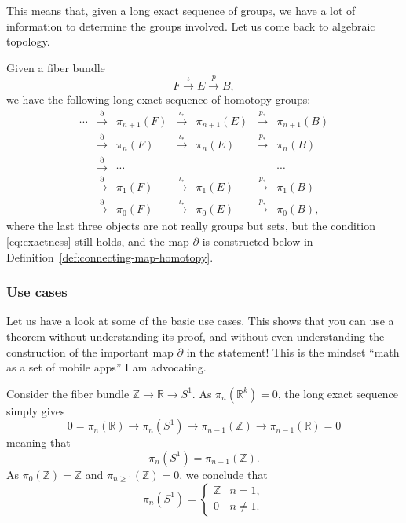 \documentclass[12pt]{article}
\numberwithin{equation}{section}
\def\bR{\mathbb{R}}
\def\bZ{\mathbb{Z}}
\begin{document}
This means that, given a long exact sequence of groups,
we have a lot of information to determine the groups involved.
Let us come back to algebraic topology.
\begin{theorem}
  \label{thm:long-exact-seq-homotopy}
  Given a fiber bundle \begin{equation}
    F\stackrel{\iota}{\longrightarrow} E\stackrel{p}{\longrightarrow} B,
  \end{equation}
  we have the following long exact sequence of homotopy groups: 
  \begin{equation}\begin{array}{cccccccc}
    \cdots 
      & \stackrel{\partial}{\longrightarrow} & \pi_{n+1}(F)  
      & \stackrel{\iota_*}{\longrightarrow} & \pi_{n+1}(E)
      & \stackrel{p_*}{\longrightarrow} & \pi_{n+1}(B)  \\
      & \stackrel{\partial}{\longrightarrow} & \pi_{n}(F)  
      & \stackrel{\iota_*}{\longrightarrow} & \pi_{n}(E)
      & \stackrel{p_*}{\longrightarrow} & \pi_{n}(B)  \\
      & \stackrel{\partial}{\longrightarrow} & \cdots & &&& \cdots \\
      & \stackrel{\partial}{\longrightarrow} & \pi_{1}(F)  
      & \stackrel{\iota_*}{\longrightarrow} & \pi_{1}(E)
      & \stackrel{p_*}{\longrightarrow} & \pi_{1}(B) \\
      & \stackrel{\partial}{\longrightarrow} & \pi_{0}(F)  
      & \stackrel{\iota_*}{\longrightarrow} & \pi_{0}(E)
      & \stackrel{p_*}{\longrightarrow} & \pi_{0}(B),
      \end{array}\end{equation}
      where the last three objects are not really groups but sets,
      but the condition \eqref{eq:exactness} still holds,
      and the map $\partial$ is constructed below in Definition~\ref{def:connecting-map-homotopy}.  
\end{theorem}


\subsubsection{Use cases}
Let us have a look at some of the basic use cases. 
This shows that you can use a theorem without understanding its proof,
and without even understanding the construction of the important map $\partial$
in the statement!
This is the mindset ``math as a set of mobile apps'' I am advocating.

Consider the fiber bundle $\bZ\to \bR \to S^1$.
As $\pi_n(\bR^k)=0$, the long exact sequence simply gives
\begin{equation}
0=\pi_n(\bR)\to \pi_n(S^1)\to \pi_{n-1}(\bZ)\to \pi_{n-1}(\bR)=0
\end{equation} meaning that \begin{equation}
  \pi_n(S^1)=\pi_{n-1}(\bZ).
\end{equation} As $\pi_0(\bZ)=\bZ$ and $\pi_{n\ge 1}(\bZ)=0$,
we conclude that \begin{equation}
  \pi_n(S^1)=\begin{cases}
    \bZ & n=1, \\
    0 & n\neq 1.
  \end{cases}
\end{equation}
\end{document}
